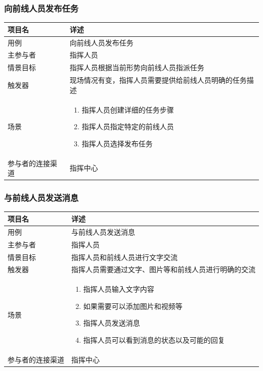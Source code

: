 \documentclass{ctexrep}
\begin{document}
\subsubsection{向前线人员发布任务}
\begin{longtable}{p{2cm} | p{10cm}}
\hline
项目名 & 详述 \\
\hline
\hline
用例 & 向前线人员发布任务\\
\hline
主参与者 & 指挥人员 \\
\hline
情景目标 &  指挥人员根据当前形势向前线人员指派任务\\
\hline
触发器 &  现场情况有变，指挥人员需要提供给前线人员明确的任务描述\\
\hline
场景 & \begin{enumerate}
	\item 指挥人员创建详细的任务步骤
	\item 指挥人员指定特定的前线人员
	\item 指挥人员选择发布任务
\end{enumerate} \\
\hline
参与者的连接渠道 & 指挥中心 \\
\hline
\end{longtable}

\subsubsection{与前线人员发送消息}
\begin{longtable}{p{2cm} | p{10cm}}
\hline
项目名 & 详述 \\
\hline
\hline
用例 & 与前线人员发送消息\\
\hline
主参与者 & 指挥人员 \\
\hline
情景目标 &  指挥人员和前线人员进行文字交流\\
\hline
触发器 &  指挥人员需要通过文字、图片等和前线人员进行明确的交流\\
\hline
场景 & \begin{enumerate}
	\item 指挥人员输入文字内容
	\item 如果需要可以添加图片和视频等
	\item 指挥人员发送消息
	\item 指挥人员可以看到消息的状态以及可能的回复
\end{enumerate} \\
\hline
参与者的连接渠道 & 指挥中心 \\
\hline
\end{longtable}
\end{document}
